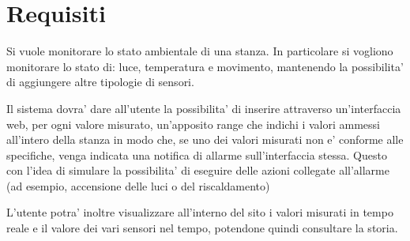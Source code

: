 \section{Requisiti}

Si vuole monitorare lo stato ambientale di una stanza. In particolare si vogliono monitorare lo stato di: luce, temperatura e movimento, mantenendo la possibilita' di aggiungere altre tipologie di sensori.

Il sistema dovra' dare all'utente la possibilita' di inserire attraverso un'interfaccia web, per ogni valore misurato, un'apposito range che indichi i valori ammessi all'intero della stanza in modo che, se uno dei valori misurati non e' conforme alle specifiche, venga indicata una notifica di allarme sull'interfaccia stessa. Questo con l'idea di simulare la possibilita' di eseguire delle azioni collegate all'allarme (ad esempio, accensione delle luci o del riscaldamento)

L'utente potra' inoltre visualizzare all'interno del sito i valori misurati in tempo reale e il valore dei vari sensori nel tempo, potendone quindi consultare la storia.
